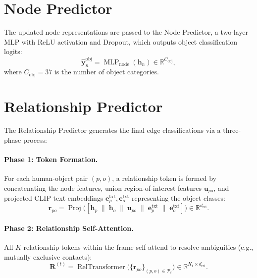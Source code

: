 \documentclass{article}
\newcommand{\mR}{\mathbb{R}}
\newcommand{\op}[1]{\operatorname{#1}}
\newcommand{\mat}[1]{\bm{#1}}
\begin{document}
\section{Node Predictor}
\label{sec:node_pred}

The updated node representations are passed to the Node Predictor, a two-layer MLP with ReLU activation and Dropout, which outputs object classification logits:
\begin{equation}
    \hat{\mat{y}}_n^{\text{obj}} = \op{MLP}_{\text{node}}(\mat{h}_n) \in \mR^{C_{\text{obj}}},
    \label{eq:node_pred}
\end{equation}
where $C_{\text{obj}}=37$ is the number of object categories.


\section{Relationship Predictor}
\label{sec:rel_pred}

The Relationship Predictor generates the final edge classifications via a three-phase process:

\paragraph{Phase 1: Token Formation.} For each human-object pair $(p, o)$, a relationship token is formed by concatenating the node features, union region-of-interest features $\mat{u}_{po}$, and projected CLIP text embeddings $\mat{e}_p^{\text{txt}}, \mat{e}_o^{\text{txt}}$ representing the object classes:
\begin{equation}
    \mat{r}_{po} = \op{Proj}\bigl([\mat{h}_p \;\|\; \mat{h}_o \;\|\; \mat{u}_{po} \;\|\; \mat{e}_p^{\text{txt}} \;\|\; \mat{e}_o^{\text{txt}}]\bigr) \in \mR^{d_{\text{rel}}}.
    \label{eq:rel_token}
\end{equation}

\paragraph{Phase 2: Relationship Self-Attention.} All $K$ relationship tokens within the frame self-attend to resolve ambiguities (e.g., mutually exclusive contacts):
\begin{equation}
    \mat{R}^{(t)} = \op{RelTransformer}\bigl(\{\mat{r}_{po}\}_{(p,o) \in \mathcal{P}_t}\bigr) \in \mR^{K_t \times d_{\text{rel}}}.
    \label{eq:rel_attn}
\end{equation}
\end{document}
